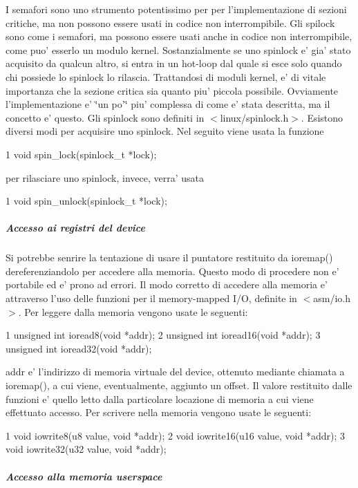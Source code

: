 I semafori sono uno strumento potentissimo per per l'implementazione di sezioni critiche, ma non possono essere usati in codice non interrompibile. Gli spilock sono come i semafori, ma possono essere usati anche in codice non interrompibile, come puo' esserlo un modulo kernel. Sostanzialmente se uno spinlock e' gia' stato acquisito da qualcun altro, si entra in un hot-\/loop dal quale si esce solo quando chi possiede lo spinlock lo rilascia. Trattandosi di moduli kernel, e' di vitale importanza che la sezione critica sia quanto piu' piccola possibile. Ovviamente l'implementazione e' \char`\"{}un po'\char`\"{} piu' complessa di come e' stata descritta, ma il concetto e' questo. Gli spinlock sono definiti in $<$linux/spinlock.\+h$>$. Esistono diversi modi per acquisire uno spinlock. Nel seguito viene usata la funzione 
\begin{DoxyCode}
1 void spin\_lock(spinlock\_t *lock);
\end{DoxyCode}
 per rilasciare uno spinlock, invece, verra' usata 
\begin{DoxyCode}
1 void spin\_unlock(spinlock\_t *lock);
\end{DoxyCode}


\subparagraph*{Accesso ai registri del device}

Si potrebbe senrire la tentazione di usare il puntatore restituito da ioremap() dereferenziandolo per accedere alla memoria. Questo modo di procedere non e' portabile ed e' prono ad errori. Il modo corretto di accedere alla memoria e' attraverso l'uso delle funzioni per il memory-\/mapped I/\+O, definite in $<$asm/io.\+h$>$. Per leggere dalla memoria vengono usate le seguenti\+: 
\begin{DoxyCode}
1 unsigned int ioread8(void *addr);
2 unsigned int ioread16(void *addr);
3 unsigned int ioread32(void *addr);
\end{DoxyCode}
 addr e' l'indirizzo di memoria virtuale del device, ottenuto mediante chiamata a ioremap(), a cui viene, eventualmente, aggiunto un offset. Il valore restituito dalle funzioni e' quello letto dalla particolare locazione di memoria a cui viene effettuato accesso. Per scrivere nella memoria vengono usate le seguenti\+: 
\begin{DoxyCode}
1 void iowrite8(u8 value, void *addr);
2 void iowrite16(u16 value, void *addr);
3 void iowrite32(u32 value, void *addr);
\end{DoxyCode}


\subparagraph*{Accesso alla memoria userspace}


